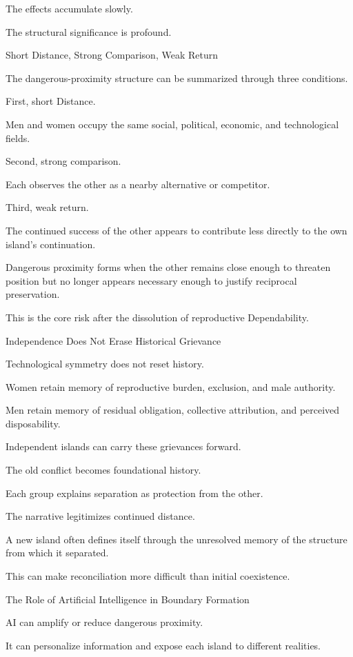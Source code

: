 The effects accumulate slowly.

The structural significance is profound.

Short Distance, Strong Comparison, Weak Return

The dangerous-proximity structure can be summarized through three conditions.

First, short Distance.

Men and women occupy the same social, political, economic, and technological fields.

Second, strong comparison.

Each observes the other as a nearby alternative or competitor.

Third, weak return.

The continued success of the other appears to contribute less directly to the own island’s continuation.

Dangerous proximity forms when the other remains close enough to threaten position but no longer appears necessary enough to justify reciprocal preservation.

This is the core risk after the dissolution of reproductive Dependability.

Independence Does Not Erase Historical Grievance

Technological symmetry does not reset history.

Women retain memory of reproductive burden, exclusion, and male authority.

Men retain memory of residual obligation, collective attribution, and perceived disposability.

Independent islands can carry these grievances forward.

The old conflict becomes foundational history.

Each group explains separation as protection from the other.

The narrative legitimizes continued distance.

A new island often defines itself through the unresolved memory of the structure from which it separated.

This can make reconciliation more difficult than initial coexistence.

The Role of Artificial Intelligence in Boundary Formation

AI can amplify or reduce dangerous proximity.

It can personalize information and expose each island to different realities.

